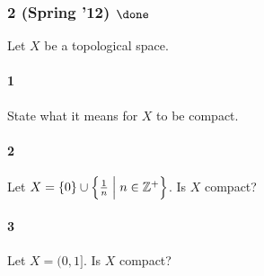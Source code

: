 \hypertarget{spring-12-done}{%
\subsubsection{\texorpdfstring{2 (Spring '12)
\(\done\)}{2 (Spring '12) \textbackslash done}}\label{spring-12-done}}

Let \(X\) be a topological space.

\hypertarget{section}{%
\paragraph{1}\label{section}}

State what it means for \(X\) to be compact.

\hypertarget{section-1}{%
\paragraph{2}\label{section-1}}

Let
\(X = \left\{{0}\right\} \cup \left\{{{1\over n} \mathrel{\Big|}n \in {\mathbb{Z}}^+ }\right\}\).
Is \(X\) compact?

\hypertarget{section-2}{%
\paragraph{3}\label{section-2}}

Let \(X = (0, 1]\). Is \(X\) compact?


